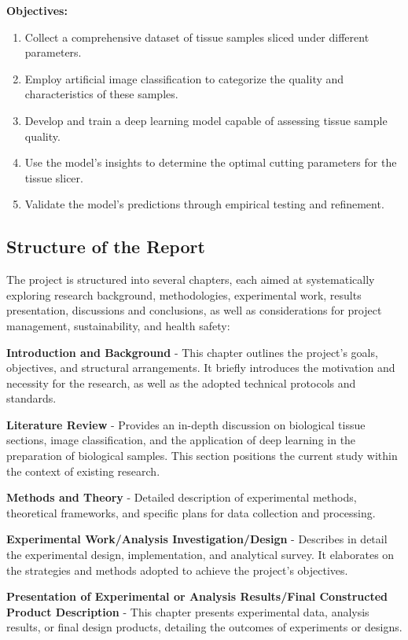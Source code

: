 \textbf{Objectives:}

\begin{enumerate}
    \item Collect a comprehensive dataset of tissue samples sliced under different parameters.
    \item Employ artificial image classification to categorize the quality and characteristics of these samples.
    \item Develop and train a deep learning model capable of assessing tissue sample quality.
    \item Use the model's insights to determine the optimal cutting parameters for the tissue slicer.
    \item Validate the model's predictions through empirical testing and refinement.
\end{enumerate}


\subsection{Structure of the Report}

The project is structured into several chapters, each aimed at systematically exploring research background, methodologies, experimental work, results presentation, discussions and conclusions, as well as considerations for project management, sustainability, and health safety:

\textbf{Introduction and Background} - This chapter outlines the project's goals, objectives, and structural arrangements. It briefly introduces the motivation and necessity for the research, as well as the adopted technical protocols and standards.

\textbf{Literature Review} - Provides an in-depth discussion on biological tissue sections, image classification, and the application of deep learning in the preparation of biological samples. This section positions the current study within the context of existing research.

\textbf{Methods and Theory} - Detailed description of experimental methods, theoretical frameworks, and specific plans for data collection and processing.

\textbf{Experimental Work/Analysis Investigation/Design} - Describes in detail the experimental design, implementation, and analytical survey. It elaborates on the strategies and methods adopted to achieve the project's objectives.

\textbf{Presentation of Experimental or Analysis Results/Final Constructed Product Description} - This chapter presents experimental data, analysis results, or final design products, detailing the outcomes of experiments or designs.

